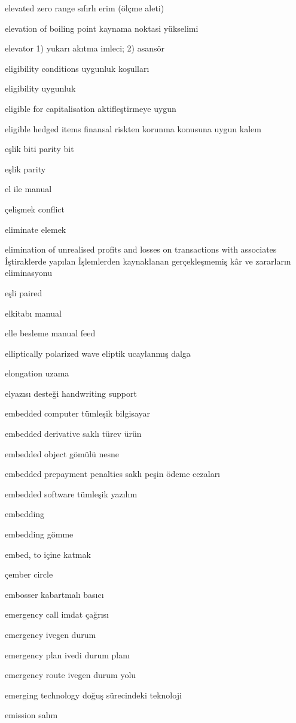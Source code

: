 \documentclass[12pt,fleqn]{article}\usepackage{../../common}
\begin{document}
elevated zero range sıfırlı erim (ölçme aleti)

elevation of boiling point kaynama noktasi yükselimi

elevator 1) yukarı akıtma imleci; 2) asansör

eligibility conditions uygunluk koşulları

eligibility uygunluk

eligible for capitalisation aktifleştirmeye uygun

eligible hedged items finansal riskten korunma konusuna uygun kalem

eşlik biti parity bit

eşlik parity

el ile manual

çelişmek conflict

eliminate elemek

elimination of unrealised profits and losses on transactions with associates İştiraklerde yapılan İşlemlerden kaynaklanan gerçekleşmemiş kâr ve zararların eliminasyonu

eşli paired

elkitabı manual

elle besleme manual feed

elliptically polarized wave eliptik ucaylanmış dalga

elongation uzama

elyazısı desteği handwriting support

embedded computer tümleşik bilgisayar

embedded derivative saklı türev ürün

embedded object gömülü nesne

embedded prepayment penalties saklı peşin ödeme cezaları

embedded software tümleşik yazılım

embedding

embedding gömme

embed, to içine katmak

çember circle

embosser kabartmalı basıcı

emergency call imdat çağrısı

emergency ivegen durum

emergency plan ivedi durum planı

emergency route ivegen durum yolu

emerging technology doğuş sürecindeki teknoloji

emission salım
\end{document}
